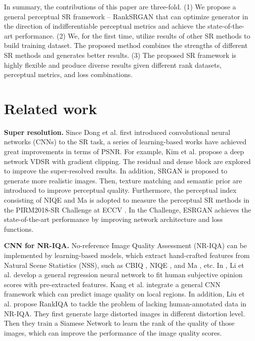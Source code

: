 \documentclass[10pt,twocolumn,letterpaper]{article}
\begin{document}
In summary, the contributions of this paper are three-fold.
(1) We propose a general perceptual SR framework -- RankSRGAN that can optimize generator in the direction of indifferentiable perceptual metrics and achieve the state-of-the-art performance. 
(2) We, for the first time, utilize results of other SR methods to build training dataset. The proposed method combines the strengths of different SR methods and generates better results.  
(3) The proposed SR framework is highly flexible and produce diverse results given different rank datasets, perceptual metrics, and loss combinations.

\section{Related work}
\label{sec:2}
\textbf{Super resolution.} Since Dong et al. \cite{dong2014learning} first introduced convolutional neural networks (CNNs) to the SR task, a series of learning-based works \cite{zhang2012single,haris2018deep,kim2016accurate, He_2019_CVPR, feng2019suppressing, gu2019blind} have achieved great improvements in terms of PSNR. For example, Kim et al. \cite{kim2016accurate} propose a deep network VDSR with gradient clipping. The residual and dense block  \cite{lim2017enhanced,zhang2018residual} are explored to improve the super-resolved results. In addition, SRGAN \cite{ledig2017photo} is proposed to generate more realistic images. Then, texture matching  \cite{sajjadi2017enhancenet} and semantic prior \cite{wang2018recovering} are introduced to improve perceptual quality. Furthermore, the perceptual index  \cite{blau20182018} consisting of NIQE \cite{mittal2013making} and  Ma \cite{ma2017learning} is adopted to measure the perceptual SR methods in the PIRM2018-SR Challenge at ECCV \cite{blau20182018}. In the Challenge, ESRGAN \cite{Wang_2018_ECCV_Workshops} achieves the state-of-the-art performance by improving network architecture and loss functions. 

\textbf{CNN for NR-IQA.} No-reference Image Quality Assessment (NR-IQA) can be implemented by learning-based models, which extract hand-crafted features from Natural Scene Statistics (NSS), such as CBIQ \cite{ye2011no}, NIQE \cite{mittal2013making}, and Ma \cite{ma2017learning}, etc. In  \cite{li2011blind}, Li et al. develop a general regression neural network to fit human subjective opinion scores with pre-extracted features. Kang et al.  \cite{kang2014convolutional,bosse2018deep} integrate a general CNN framework which can predict image quality on local regions. In addition, Liu et al.  \cite{liu2017rankiqa} propose RankIQA to tackle the problem of lacking human-annotated data in NR-IQA. They first generate large distorted images in different distortion level. Then they train a Siamese Network to learn the rank of the quality of those images, which can improve the performance of the image quality scores.
\end{document}
